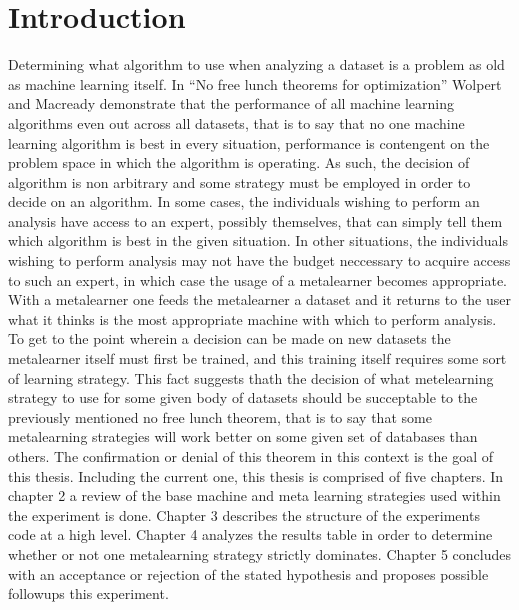 \chapter{Introduction}
\label{Introduction}
  Determining what algorithm to use when analyzing a dataset is a problem as old as
  machine learning itself. In ``No free lunch theorems for optimization'' Wolpert and Macready
  demonstrate that the performance of all machine learning algorithms even out across all datasets,
  that is to say that no one machine learning algorithm is best in every situation, performance is
  contengent on the problem space in which the algorithm is operating. As such, the decision of algorithm
  is non arbitrary and some strategy must be employed in order to decide on an algorithm.
  In some cases, the individuals wishing to perform an analysis
  have access to an expert, possibly themselves, that can simply tell them which algorithm
  is best in the given situation. In other situations, the individuals wishing to perform
  analysis may not have the budget neccessary to acquire access to such an expert, in which
  case the usage of a metalearner becomes appropriate. With a metalearner one feeds the
  metalearner a dataset and it returns to the user what it thinks is the most appropriate
  machine with which to perform analysis. To get to the point wherein a decision can be made
  on new datasets the metalearner itself must first be trained, and this training itself
  requires some sort of learning strategy. This fact suggests thath the decision of what
  metelearning strategy to use for some given body of datasets should be succeptable to
  the previously mentioned no free lunch theorem, that is to say that some metalearning strategies will
  work better on some given set of databases than others. The confirmation or denial of this
  theorem in this context is the goal of this thesis. Including the current one, this thesis is comprised
  of five chapters. In chapter 2 a review of the base machine and meta learning strategies used within
  the experiment is done. Chapter 3 describes the structure of the experiments code at a high level.
  Chapter 4 analyzes the results table in order to determine whether or not one metalearning strategy
  strictly dominates. Chapter 5 concludes with an acceptance or rejection of the stated hypothesis and
  proposes possible followups this experiment.
